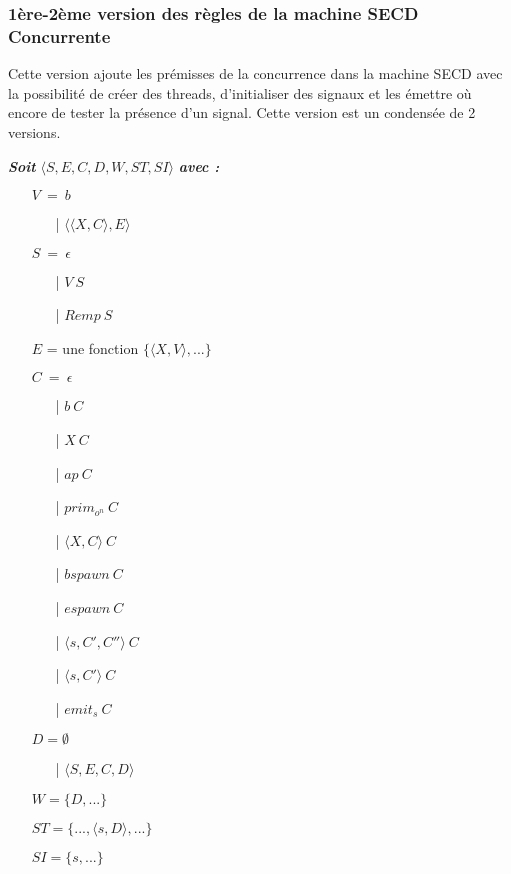 \documentclass[10pt,a4paper]{report}
\begin{document}
	\subsubsection{1ère-2ème version des règles de la machine SECD Concurrente}\label{SECDConc1-2}
	\smallbreak
	Cette version ajoute les prémisses de la concurrence dans la machine SECD avec la possibilité de créer des threads, d'initialiser des signaux et les émettre où encore de tester la présence d'un signal. Cette version est un condensée de 2 versions.
	\bigbreak
	
	\textbf{\textit{Soit}} $\langle S,E,C,D,W,ST,SI\rangle$ \textbf{\textit{avec :}}
	
	
	\begin{itemize}
		\item[] $V~=~b$
		\begin{itemize}
			\item[|] $\langle\langle X,C\rangle,E\rangle$
		\end{itemize}
		\item[] $S~=~\epsilon$ 
		\begin{itemize}
			\item[|] $V~S$ 
			\item[|] $Remp~S$
		\end{itemize}
		\item[] $E$ = une fonction $\{\langle X,V\rangle,...\}$
		\item[] $C~=~\epsilon$ 
		\begin{itemize}
			\item[|] $b~C$
			\item[|] $X~C$
			\item[|] $ap~C$
			\item[|] $prim_{o^{n}}~C$  
			\item[|] $\langle X,C\rangle~C$
			\item[|] $bspawn~C$ 
			\item[|] $espawn~C$
			\item[|] $\langle s,C',C''\rangle~C$
			\item[|] $\langle s,C'\rangle~C$ 
			\item[|] $emit_{s}~C$ 
		\end{itemize}
		\item[] $D = \emptyset$
		\begin{itemize}
			\item[|] $\langle S,E,C,D\rangle$ 
		\end{itemize}
		\item[] $W = \{D,...\}$
		\item[] $ST = \{...,\langle s,D\rangle,...\}$
		\item[] $SI = \{ s,...\}$
	\end{itemize}
	\bigbreak
	\bigbreak
	
\end{document}
